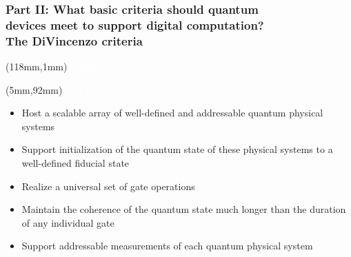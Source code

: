 \documentclass[x11names, svgnames]{beamer}
\begin{document}
\begin{frame}
\frametitle{Part II: What basic criteria should quantum \\devices meet to support digital computation?\\ \small{The DiVincenzo criteria}}
\begin{textblock*}{50mm}(118mm,1mm)
\scriptsize
\textcolor{white}{\textbf{IEEE}}
\end{textblock*}
\begin{textblock*}{100mm}(5mm,92mm)
\scriptsize
\textcolor{white}{SOURCE: arXiv: 2008.09612}
\end{textblock*}
\vspace{0.1in}

\begin{itemize}
    \item Host a scalable array of well-defined and addressable quantum physical systems
    \item Support initialization of the quantum state of these physical systems to a well-defined fiducial state
    \item Realize a universal set of gate operations
    \item Maintain the coherence of the quantum state much longer than the duration of any individual gate
    \item Support addressable measurements of each quantum physical system
\end{itemize}

\end{frame}
\end{document}
